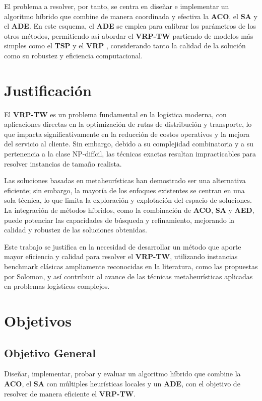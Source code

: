 \documentclass[12pt,titlepage,twoside,openright]{book}
\begin{document}
El problema a resolver, por tanto, se centra en diseñar e implementar un algoritmo híbrido que combine de manera coordinada y efectiva la \textbf{ACO}, el \textbf{SA} y el \textbf{ADE}. En este esquema, el \textbf{ADE} se emplea para calibrar los parámetros de los otros métodos, permitiendo así abordar el \textbf{VRP-TW}  partiendo de modelos más simples como el \textbf{TSP}  y el \textbf{VRP} , considerando tanto la calidad de la solución como su robustez y eficiencia computacional.

\section{Justificación}

El \textbf{VRP-TW} es un problema fundamental en la logística moderna, con aplicaciones directas en la optimización de rutas de distribución y transporte, lo que impacta significativamente en la reducción de costos operativos y la mejora del servicio al cliente. Sin embargo, debido a su complejidad combinatoria y a su pertenencia a la clase NP-difícil, las técnicas exactas resultan impracticables para resolver instancias de tamaño realista.

Las soluciones basadas en metaheurísticas han demostrado ser una alternativa eficiente; sin embargo, la mayoría de los enfoques existentes se centran en una sola técnica, lo que limita la exploración y explotación del espacio de soluciones. La integración de métodos híbridos, como la combinación de \textbf{ACO}, \textbf{SA} y \textbf{AED}, puede potenciar las capacidades de búsqueda y refinamiento, mejorando la calidad y robustez de las soluciones obtenidas.

Este trabajo se justifica en la necesidad de desarrollar un método que aporte mayor eficiencia y calidad para resolver el \textbf{VRP-TW}, utilizando instancias benchmark clásicas ampliamente reconocidas en la literatura, como las propuestas por Solomon, y así contribuir al avance de las técnicas metaheurísticas aplicadas en problemas logísticos complejos.

\section{Objetivos}

\subsection{Objetivo General}


Diseñar, implementar, probar y evaluar un algoritmo híbrido que combine la \textbf{ACO}, el \textbf{SA} con múltiples heurísticas locales y un \textbf{ADE}, con el objetivo de resolver de manera eficiente el \textbf{VRP-TW}.
\end{document}
